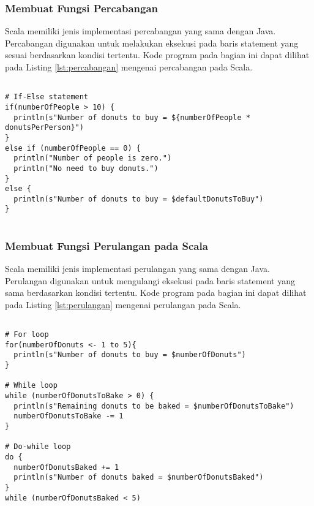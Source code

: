 \subsubsection{Membuat Fungsi Percabangan}
Scala memiliki jenis implementasi percabangan yang sama dengan Java. Percabangan digunakan untuk melakukan eksekusi pada baris statement yang sesuai berdasarkan kondisi tertentu. Kode program pada bagian ini dapat dilihat pada Listing \ref{lst:percabangan} mengenai percabangan pada Scala.

\begin{lstlisting}[basicstyle=\ttfamily, frame=single,
	columns=fullflexible, keepspaces=true, breaklines=true, label=lst:percabangan, caption=Membuat Fungsi Percabangan pada Scala]

# If-Else statement
if(numberOfPeople > 10) { 
  println(s"Number of donuts to buy = ${numberOfPeople * donutsPerPerson}")
}
else if (numberOfPeople == 0) {
  println("Number of people is zero.")
  println("No need to buy donuts.")
} 
else {
  println(s"Number of donuts to buy = $defaultDonutsToBuy")
}
	
\end{lstlisting}

\subsubsection{Membuat Fungsi Perulangan pada Scala}
Scala memiliki jenis implementasi perulangan yang sama dengan Java. Perulangan digunakan untuk mengulangi eksekusi pada baris statement yang sama berdasarkan kondisi tertentu. Kode program pada bagian ini dapat dilihat pada Listing \ref{lst:perulangan} mengenai perulangan pada Scala.

\begin{lstlisting}[basicstyle=\ttfamily, frame=single,
	columns=fullflexible, keepspaces=true, breaklines=true, label=lst:perulangan, caption=Membuat Fungsi Perulangan pada Scala]
	
# For loop
for(numberOfDonuts <- 1 to 5){
  println(s"Number of donuts to buy = $numberOfDonuts")
}

# While loop
while (numberOfDonutsToBake > 0) {
  println(s"Remaining donuts to be baked = $numberOfDonutsToBake")
  numberOfDonutsToBake -= 1
}

# Do-while loop
do {
  numberOfDonutsBaked += 1
  println(s"Number of donuts baked = $numberOfDonutsBaked")
} 
while (numberOfDonutsBaked < 5)

\end{lstlisting}



